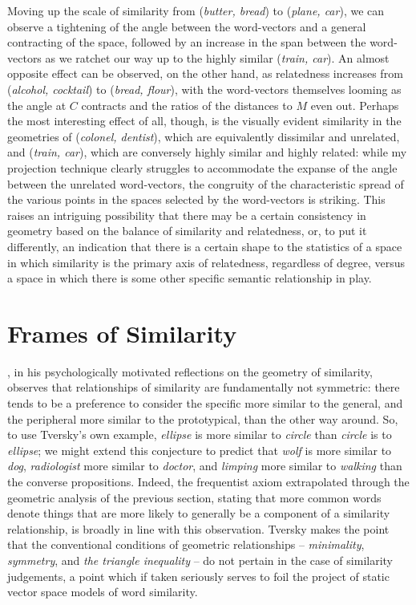 Moving up the scale of similarity from (\emph{butter, bread}) to (\emph{plane, car}), we can observe a tightening of the angle between the word-vectors and a general contracting of the space, followed by an increase in the span between the word-vectors as we ratchet our way up to the highly similar (\emph{train, car}).  An almost opposite effect can be observed, on the other hand, as relatedness increases from (\emph{alcohol, cocktail}) to (\emph{bread, flour}), with the word-vectors themselves looming as the angle at $C$ contracts and the ratios of the distances to $M$ even out.  Perhaps the most interesting effect of all, though, is the visually evident similarity in the geometries of (\emph{colonel, dentist}), which are equivalently dissimilar and unrelated, and (\emph{train, car}), which are conversely highly similar and highly related: while my projection technique clearly struggles to accommodate the expanse of the angle between the unrelated word-vectors, the congruity of the characteristic spread of the various points in the spaces selected by the word-vectors is striking.  This raises an intriguing possibility that there may be a certain consistency in geometry based on the balance of similarity and relatedness, or, to put it differently, an indication that there is a certain shape to the statistics of a space in which similarity is the primary axis of relatedness, regardless of degree, versus a space in which there is some other specific semantic relationship in play.

\section{Frames of Similarity} \label{sec:frames}
\cite{Tversky1977}, in his psychologically motivated reflections on the geometry of similarity, observes that relationships of similarity are fundamentally not symmetric: there tends to be a preference to consider the specific more similar to the general, and the peripheral more similar to the prototypical, than the other way around.  So, to use Tversky's own example, \emph{ellipse} is more similar to \emph{circle} than \emph{circle} is to \emph{ellipse}; we might extend this conjecture to predict that \emph{wolf} is more similar to \emph{dog}, \emph{radiologist} more similar to \emph{doctor}, and \emph{limping} more similar to \emph{walking} than the converse propositions.  Indeed, the frequentist axiom extrapolated through the geometric analysis of the previous section, stating that more common words denote things that are more likely to generally be a component of a similarity relationship, is broadly in line with this observation.  Tversky makes the point that the conventional conditions of geometric relationships -- \emph{minimality}, \emph{symmetry}, and \emph{the triangle inequality} -- do not pertain in the case of similarity judgements, a point which if taken seriously serves to foil the project of static vector space models of word similarity.

